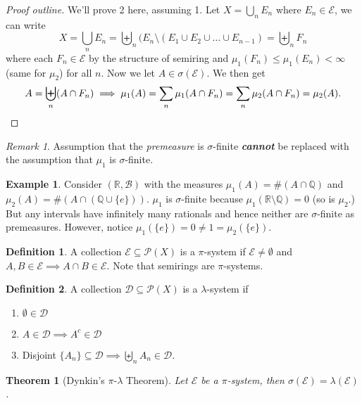 \documentclass[letterpaper,12pt]{article}
\theoremstyle{definition}
\newtheorem{definition}{Definition}[section]
\newtheorem{example}{Example}[section]
\theoremstyle{plain}
\newtheorem{thm}{Theorem}[section]
\theoremstyle{remark}
\newtheorem*{remark}{Remark}
\newcommand{\R}{\mathbb{R}}
\newcommand{\Q}{\mathbb{Q}}
\begin{document}
\begin{proof}[Proof outline]
We'll prove 2 here, assuming 1. Let $X = \bigcup_n E_n$ where $E_n\in \mathcal{E}$, we can write
\[X= \bigcup_n E_n = \biguplus_n (E_n\setminus (E_1\cup E_2\cup\ldots\cup E_{n-1})  = \biguplus_n F_n\]
where each $F_n\in \mathcal{E}$ by the structure of semiring and $\mu_1(F_n)\leq\mu_1(E_n)<\infty$ (same for $\mu_2$) for all $n$. Now we let $A\in \sigma(\mathcal{E})$. We then get
\[A = \biguplus_n (A\cap F_n)\implies \mu_1(A) = \sum_n \mu_1(A\cap F_n) = \sum_n \mu_2(A\cap F_n) = \mu_2(A).\qedhere\]
\end{proof}


\begin{remark}
Assumption that the \emph{premeasure} is $\sigma$-finite \textbf{\emph{cannot}} be replaced with the assumption that $\mu_1$ is $\sigma$-finite.
\end{remark}

\begin{example}
Consider $(\R,\mathcal{B})$ with the measures $\mu_1(A) = \#(A\cap \Q)$ and $\mu_2(A) = \#(A\cap (\Q\cup \{e\}))$. $\mu_1$ is $\sigma$-finite because $\mu_1(\R\setminus\Q) = 0$ (so is $\mu_2$.) But any intervals have infinitely many rationals and hence neither are $\sigma$-finite as premeasures. However, notice $\mu_1(\{e\})=0\ne1=\mu_2(\{e\})$.
\end{example}

\begin{definition}
A collection $\mathcal{E}\subseteq \mathcal{P}(X)$ is a $\pi$-system if $\mathcal{E}\neq\emptyset$ and $A,B\in \mathcal{E}\implies A\cap B\in \mathcal{E}$. Note that semirings are $\pi$-systems.
\end{definition}

\begin{definition}
A collection $\mathcal{D}\subseteq \mathcal{P}(X)$ is a $\lambda$-system if
\begin{enumerate}
  \item $\emptyset\in \mathcal{D}$
  \item $A\in \mathcal{D}\implies A^c\in \mathcal{D}$
  \item Disjoint $\{A_n\}\subseteq \mathcal{D}\implies \biguplus_n A_n\in \mathcal{D}$.
\end{enumerate}
\end{definition}

\begin{thm}[Dynkin's $\pi\text{-}\lambda$ Theorem]
Let $\mathcal{E}$ be a $\pi$-system, then $\sigma(\mathcal{E})= \lambda(\mathcal{E})$.
\end{thm}
\end{document}
